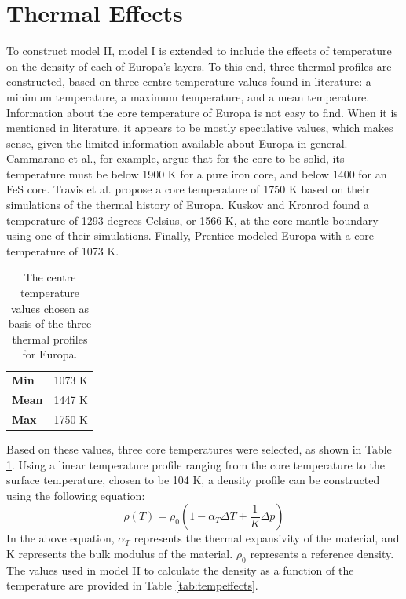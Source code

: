 \documentclass[twocolumn]{article}
\begin{document}
\section{Thermal Effects}
To construct model II, model I is extended to include the effects of temperature on the density of each of Europa's layers. To this end, three thermal profiles are constructed, based on three centre temperature values found in literature: a minimum temperature, a maximum temperature, and a mean temperature.\\
\indent Information about the core temperature of Europa is not easy to find. When it is mentioned in literature, it appears to be mostly speculative values, which makes sense, given the limited information available about Europa in general. Cammarano et al.\cite{cammaranoLongperiodSeismologyEuropa2006}, for example, argue that for the core to be solid, its temperature must be below 1900 K for a pure iron core, and below 1400 for an FeS core. Travis et al.\cite{travisWholemoonThermalHistory2012} propose a core temperature of 1750 K based on their simulations of the thermal history of Europa. Kuskov and Kronrod\cite{kronrodChemicalDifferentiationGalilean2006} found a temperature of 1293 degrees Celsius, or 1566 K, at the core-mantle boundary using one of their simulations. Finally, Prentice\cite{prenticeORIGINBULKCHEMICAL1999} modeled Europa with a core temperature of 1073 K.
\begin{table}[H]
	\centering
	\caption{The centre temperature values chosen as basis of the three thermal profiles for Europa.}
	\medskip
	\label{tab:coretemps}
	\begin{tabular}{l|l}
		\textbf{Min}  & 1073 K \\
		\textbf{Mean} & 1447 K \\
		\textbf{Max}  & 1750 K
	\end{tabular}%
\end{table}
\noindent Based on these values, three core temperatures were selected, as shown in Table \ref{tab:coretemps}. Using a linear temperature profile ranging from the core temperature to the surface temperature, chosen to be 104 K\cite{howellLikelyThicknessEuropas2021}, a density profile can be constructed using the following equation:
\begin{equation}
	\label{eq:temperature}
	\rho(T) = \rho_0(1-\alpha_T\Delta T + \frac{1}{K}\Delta p)
\end{equation}
In the above equation, $\alpha_T$ represents the thermal expansivity of the material, and K represents the bulk modulus of the material. $\rho_0$ represents a reference density. The values used in model II to calculate the density as a function of the temperature are provided in Table \ref{tab:tempeffects}.
\end{document}
